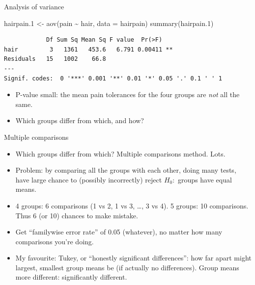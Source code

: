 \documentclass[
  ignorenonframetext,
]{beamer}
\newenvironment{Shaded}{\begin{snugshade}}{\end{snugshade}}
\newcommand{\AttributeTok}[1]{\textcolor[rgb]{0.40,0.45,0.13}{#1}}
\newcommand{\FloatTok}[1]{\textcolor[rgb]{0.68,0.00,0.00}{#1}}
\newcommand{\FunctionTok}[1]{\textcolor[rgb]{0.28,0.35,0.67}{#1}}
\newcommand{\NormalTok}[1]{\textcolor[rgb]{0.00,0.23,0.31}{#1}}
\newcommand{\OtherTok}[1]{\textcolor[rgb]{0.00,0.23,0.31}{#1}}
\newcommand{\SpecialCharTok}[1]{\textcolor[rgb]{0.37,0.37,0.37}{#1}}
\begin{document}
\begin{frame}[fragile]{Analysis of variance}
\protect\hypertarget{analysis-of-variance-1}{}
\small

\begin{Shaded}
\begin{Highlighting}[]
\NormalTok{hairpain}\FloatTok{.1} \OtherTok{\textless{}{-}} \FunctionTok{aov}\NormalTok{(pain }\SpecialCharTok{\textasciitilde{}}\NormalTok{ hair, }\AttributeTok{data =}\NormalTok{ hairpain)}
\FunctionTok{summary}\NormalTok{(hairpain}\FloatTok{.1}\NormalTok{)}
\end{Highlighting}
\end{Shaded}

\begin{verbatim}
            Df Sum Sq Mean Sq F value  Pr(>F)   
hair         3   1361   453.6   6.791 0.00411 **
Residuals   15   1002    66.8                   
---
Signif. codes:  0 '***' 0.001 '**' 0.01 '*' 0.05 '.' 0.1 ' ' 1
\end{verbatim}

\normalsize

\begin{itemize}
\item
  P-value small: the mean pain tolerances for the four groups are
  \emph{not} all the same.
\item
  Which groups differ from which, and how?
\end{itemize}
\end{frame}

\begin{frame}{Multiple comparisons}
\protect\hypertarget{multiple-comparisons}{}
\begin{itemize}
\item
  Which groups differ from which? Multiple comparisons method. Lots.
\item
  Problem: by comparing all the groups with each other, doing many
  tests, have large chance to (possibly incorrectly) reject \(H_0:\)
  groups have equal means.
\item
  4 groups: 6 comparisons (1 vs 2, 1 vs 3, \ldots, 3 vs 4). 5 groups: 10
  comparisons. Thus 6 (or 10) chances to make mistake.
\item
  Get ``familywise error rate'' of 0.05 (whatever), no matter how many
  comparisons you're doing.
\item
  My favourite: Tukey, or ``honestly significant differences'': how far
  apart might largest, smallest group means be (if actually no
  differences). Group means more different: significantly different.
\end{itemize}
\end{frame}
\end{document}
